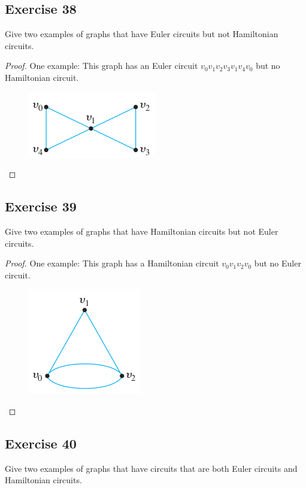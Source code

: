 \documentclass[14pt]{extarticle}
\begin{document}
\subsection{Exercise 38}
Give two examples of graphs that have Euler circuits but not Hamiltonian circuits.

\begin{proof}
    One example: This graph has an Euler circuit \(v_0v_1v_2v_3v_1v_4v_0\) but no Hamiltonian circuit.

    \begin{figure}[ht!]
        \centering
        \includegraphics[scale=0.5]{../images/10.1.38.png}
    \end{figure}
\end{proof}

\subsection{Exercise 39}
Give two examples of graphs that have Hamiltonian circuits but not Euler circuits.

\begin{proof}
    One example: This graph has a Hamiltonian circuit \(v_0v_1v_2v_0\) but no Euler circuit.

    \begin{figure}[ht!]
        \centering
        \includegraphics[scale=0.5]{../images/10.1.39.png}
    \end{figure}
\end{proof}

\subsection{Exercise 40}
Give two examples of graphs that have circuits that are both Euler circuits and Hamiltonian circuits.
\end{document}
